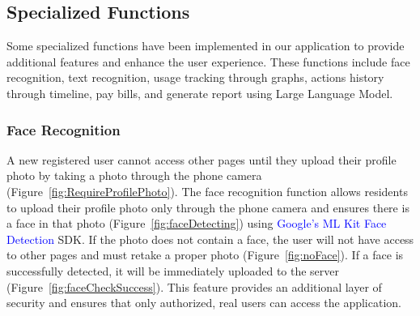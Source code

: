 \documentclass[sigconf,nonacm]{acmart}\settopmatter{printfolios=true}
\newcommand{\specialterm}[1]{\textcolor{blue}{#1}}
\begin{document}
\subsection{Specialized Functions}
Some specialized functions have been implemented in our application to provide additional features and enhance the user experience. These functions include face recognition, text recognition, usage tracking through graphs, actions history through timeline, pay bills, and generate report using Large Language Model.

\subsubsection{\textbf{Face Recognition}}
A new registered user cannot access other pages until they upload their profile photo by taking a photo through the phone camera (Figure~\ref{fig:RequireProfilePhoto}).
The face recognition function allows residents to upload their profile photo only through the phone camera and ensures there is a face in that photo (Figure~\ref{fig:faceDetecting}) using \specialterm{Google's ML Kit Face Detection} SDK. If the photo does not contain a face, the user will not have access to other pages and must retake a proper photo (Figure~\ref{fig:noFace}). If a face is successfully detected, it will be immediately uploaded to the server (Figure~\ref{fig:faceCheckSuccess}).
This feature provides an additional layer of security and ensures that only authorized, real users can access the application.
\end{document}
